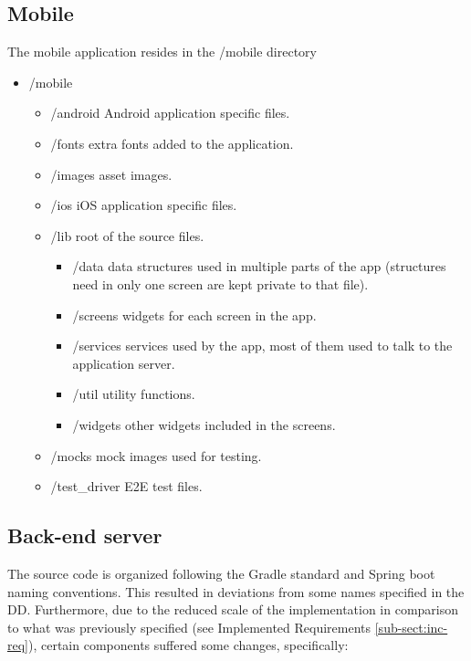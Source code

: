 \subsection{Mobile}
The mobile application resides in the /mobile directory

\begin{itemize}
    \item 
    /mobile
    \begin{itemize}[label={$\diamond$}]
        \item 
        /android \textcolor{black!70}{Android application specific files.}
        \item 
        /fonts \textcolor{black!70}{extra fonts added to the application.}
        \item 
        /images \textcolor{black!70}{asset images.}
        \item 
        /ios \textcolor{black!70}{iOS application specific files.}
        \item 
        /lib \textcolor{black!70}{root of the source files.}
        \begin{itemize}[label={\textbf{-}}]
            \item 
            /data \textcolor{black!70}{data structures used in multiple parts of the app (structures need in only one screen are kept private to that file).}
            \item 
            /screens \textcolor{black!70}{widgets for each screen in the app.}
            \item 
            /services \textcolor{black!70}{services used by the app, most of them used to talk to the application server.}
            \item 
            /util \textcolor{black!70}{utility functions.}
            \item 
            /widgets \textcolor{black!70}{other widgets included in the screens.}
        \end{itemize}
        \item 
        /mocks \textcolor{black!70}{mock images used for testing.}
        \item 
        /test\_driver \textcolor{black!70}{E2E test files.}
    \end{itemize}
\end{itemize}

\subsection{Back-end server}
The source code is organized following the Gradle standard and Spring boot naming conventions. This resulted in deviations from some names specified in the DD. Furthermore, due to the reduced scale of the implementation in comparison to what was previously specified (see Implemented Requirements \ref{sub-sect:inc-req}), certain components suffered some changes, specifically:\\

